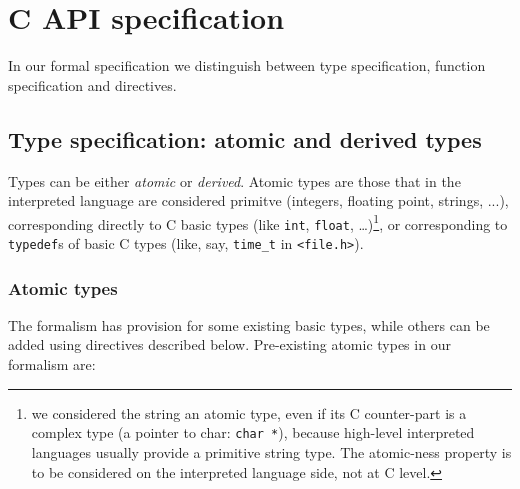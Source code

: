 \documentclass[10pt,twocolumn]{article}
\begin{document}
\section{C API specification}

In our formal specification we distinguish between type specification,
function specification and directives.

\subsection{Type specification: atomic and derived types}

Types can be either \textsl{atomic} or \textsl{derived}. Atomic types
are those that in the interpreted language are considered primitve
(integers, floating point, strings, ...), corresponding directly to C
basic types (like \texttt{int}, \texttt{float}, \dots)\footnote{we
  considered the string an atomic type, even if its C counter-part is
  a complex type (a pointer to char: \texttt{char *}), because
  high-level interpreted languages usually provide a primitive string
  type. The atomic-ness property is to be considered on the
  interpreted language side, not at C level.}, or corresponding to
\texttt{typedef}s of basic C types (like, say, \texttt{time\_t} in
\texttt{<file.h>}).\par

\subsubsection{Atomic types}

The formalism has provision for some existing basic types, while
others can be added using directives described below.
Pre-existing atomic types in our formalism are:
\end{document}
